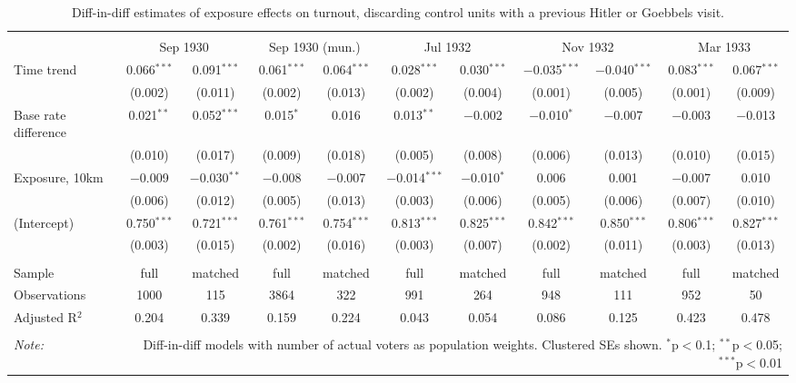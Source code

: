 
\begin{table}[!htbp] \centering 
  \caption{Diff-in-diff estimates of exposure effects on turnout, discarding control units with a previous Hitler or Goebbels visit.\vspace{-.25cm}} 
  \label{tab:turnout-dd-control-no-prev-visit} 
\scriptsize 
\begin{tabular}{@{\extracolsep{5pt}}lcccccccccc} 
\\[-1.8ex]\hline 
\hline \\[-1.8ex] 
 & \multicolumn{2}{c}{Sep 1930} & \multicolumn{2}{c}{Sep 1930 (mun.)} & \multicolumn{2}{c}{Jul 1932} & \multicolumn{2}{c}{Nov 1932} & \multicolumn{2}{c}{Mar 1933} \\ 
 \cmidrule(r){2-3}\cmidrule(r){4-5}\cmidrule(r){6-7}\cmidrule(r){8-9}\cmidrule(r){10-11}Time trend & 0.066$^{***}$ & 0.091$^{***}$ & 0.061$^{***}$ & 0.064$^{***}$ & 0.028$^{***}$ & 0.030$^{***}$ & $-$0.035$^{***}$ & $-$0.040$^{***}$ & 0.083$^{***}$ & 0.067$^{***}$ \\ 
  & (0.002) & (0.011) & (0.002) & (0.013) & (0.002) & (0.004) & (0.001) & (0.005) & (0.001) & (0.009) \\ 
  Base rate difference & 0.021$^{**}$ & 0.052$^{***}$ & 0.015$^{*}$ & 0.016 & 0.013$^{**}$ & $-$0.002 & $-$0.010$^{*}$ & $-$0.007 & $-$0.003 & $-$0.013 \\ 
  & (0.010) & (0.017) & (0.009) & (0.018) & (0.005) & (0.008) & (0.006) & (0.013) & (0.010) & (0.015) \\ 
  Exposure, 10km & $-$0.009 & $-$0.030$^{**}$ & $-$0.008 & $-$0.007 & $-$0.014$^{***}$ & $-$0.010$^{*}$ & 0.006 & 0.001 & $-$0.007 & 0.010 \\ 
  & (0.006) & (0.012) & (0.005) & (0.013) & (0.003) & (0.006) & (0.005) & (0.006) & (0.007) & (0.010) \\ 
  (Intercept) & 0.750$^{***}$ & 0.721$^{***}$ & 0.761$^{***}$ & 0.754$^{***}$ & 0.813$^{***}$ & 0.825$^{***}$ & 0.842$^{***}$ & 0.850$^{***}$ & 0.806$^{***}$ & 0.827$^{***}$ \\ 
  & (0.003) & (0.015) & (0.002) & (0.016) & (0.003) & (0.007) & (0.002) & (0.011) & (0.003) & (0.013) \\ 
 \hline \\[-1.8ex] 
Sample & full & matched & full & matched & full & matched & full & matched & full & matched \\ 
Observations & 1000 & 115 & 3864 & 322 & 991 & 264 & 948 & 111 & 952 & 50 \\ 
Adjusted R$^{2}$ & 0.204 & 0.339 & 0.159 & 0.224 & 0.043 & 0.054 & 0.086 & 0.125 & 0.423 & 0.478 \\ 
\hline 
\hline \\[-1.8ex] 
\textit{Note:}  & \multicolumn{10}{r}{Diff-in-diff models with number of actual voters as population weights. Clustered SEs shown. $^{*}$p$<$0.1; $^{**}$p$<$0.05; $^{***}$p$<$0.01} \\ 
\end{tabular} 
\end{table} 
